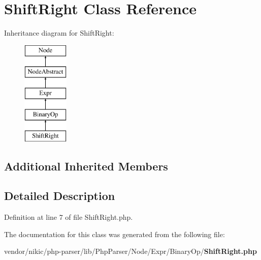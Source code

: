 \section{Shift\+Right Class Reference}
\label{class_php_parser_1_1_node_1_1_expr_1_1_binary_op_1_1_shift_right}
Inheritance diagram for Shift\+Right\+:\begin{figure}[H]
\begin{center}
\leavevmode
\includegraphics[height=5.000000cm]{class_php_parser_1_1_node_1_1_expr_1_1_binary_op_1_1_shift_right}
\end{center}
\end{figure}
\subsection*{Additional Inherited Members}


\subsection{Detailed Description}


Definition at line 7 of file Shift\+Right.\+php.



The documentation for this class was generated from the following file\+:\begin{DoxyCompactItemize}
\item 
vendor/nikic/php-\/parser/lib/\+Php\+Parser/\+Node/\+Expr/\+Binary\+Op/{\bf Shift\+Right.\+php}\end{DoxyCompactItemize}
